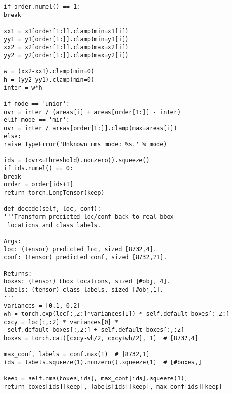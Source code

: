\begin{lstlisting}
if order.numel() == 1:
break

xx1 = x1[order[1:]].clamp(min=x1[i])
yy1 = y1[order[1:]].clamp(min=y1[i])
xx2 = x2[order[1:]].clamp(max=x2[i])
yy2 = y2[order[1:]].clamp(max=y2[i])

w = (xx2-xx1).clamp(min=0)
h = (yy2-yy1).clamp(min=0)
inter = w*h

if mode == 'union':
ovr = inter / (areas[i] + areas[order[1:]] - inter)
elif mode == 'min':
ovr = inter / areas[order[1:]].clamp(max=areas[i])
else:
raise TypeError('Unknown nms mode: %s.' % mode)

ids = (ovr<=threshold).nonzero().squeeze()
if ids.numel() == 0:
break
order = order[ids+1]
return torch.LongTensor(keep)

def decode(self, loc, conf):
'''Transform predicted loc/conf back to real bbox
 locations and class labels.

Args:
loc: (tensor) predicted loc, sized [8732,4].
conf: (tensor) predicted conf, sized [8732,21].

Returns:
boxes: (tensor) bbox locations, sized [#obj, 4].
labels: (tensor) class labels, sized [#obj,1].
'''
variances = [0.1, 0.2]
wh = torch.exp(loc[:,2:]*variances[1]) * self.default_boxes[:,2:]
cxcy = loc[:,:2] * variances[0] *
 self.default_boxes[:,2:] + self.default_boxes[:,:2]
boxes = torch.cat([cxcy-wh/2, cxcy+wh/2], 1)  # [8732,4]

max_conf, labels = conf.max(1)  # [8732,1]
ids = labels.squeeze(1).nonzero().squeeze(1)  # [#boxes,]

keep = self.nms(boxes[ids], max_conf[ids].squeeze(1))
return boxes[ids][keep], labels[ids][keep], max_conf[ids][keep]
\end{lstlisting}
